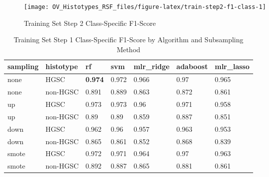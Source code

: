 \documentclass[
]{report}
\begin{document}
\begin{figure}[H]

{\centering \texttt{[image: OV\_Histotypes\_RSF\_files/figure-latex/train-step2-f1-class-1]} 

}

\caption{Training Set Step 2 Class-Specific F1-Score}\label{fig:train-step2-f1-class}
\end{figure}

\begin{table}

\caption{\label{tab:train-step1-f1-class-table}Training Set Step 1 Class-Specific F1-Score by Algorithm and Subsampling Method}
\centering
\begin{tabular}[t]{l|l|l|l|l|l|l}
\hline
sampling & histotype & rf & svm & mlr\_ridge & adaboost & mlr\_lasso\\
\hline
none & HGSC & \textbf{0.974} & 0.972 & 0.966 & 0.97 & 0.965\\
\hline
none & non-HGSC & 0.891 & 0.889 & 0.863 & 0.872 & 0.861\\
\hline
up & HGSC & 0.973 & 0.973 & 0.96 & 0.971 & 0.958\\
\hline
up & non-HGSC & 0.89 & 0.89 & 0.859 & 0.887 & 0.851\\
\hline
down & HGSC & 0.962 & 0.96 & 0.957 & 0.963 & 0.953\\
\hline
down & non-HGSC & 0.865 & 0.861 & 0.852 & 0.868 & 0.839\\
\hline
smote & HGSC & 0.972 & 0.971 & 0.964 & 0.97 & 0.963\\
\hline
smote & non-HGSC & 0.892 & 0.887 & 0.865 & 0.881 & 0.861\\
\hline
\end{tabular}
\end{table}
\end{document}
